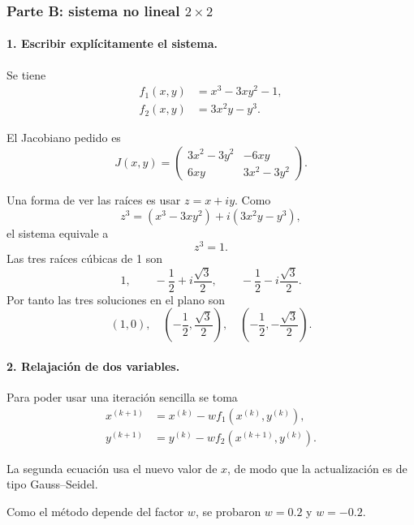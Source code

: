 \documentclass[11pt,a4paper]{article}
\begin{document}
\subsubsection*{Parte B: sistema no lineal $2\times2$}

\paragraph{1. Escribir explícitamente el sistema.}

Se tiene
\begin{align}
f_1(x,y)&=x^3-3xy^2-1,\\
f_2(x,y)&=3x^2y-y^3.
\end{align}

El Jacobiano pedido es
\begin{equation}
\boxed{
J(x,y)=
\begin{pmatrix}
3x^2-3y^2&-6xy\\
6xy&3x^2-3y^2
\end{pmatrix}.}
\end{equation}

Una forma de ver las raíces es usar $z=x+iy$. Como
\[
z^3=(x^3-3xy^2)+i(3x^2y-y^3),
\]
el sistema equivale a
\[
z^3=1.
\]
Las tres raíces cúbicas de 1 son
\[
1,
\qquad
-\frac12+i\frac{\sqrt3}{2},
\qquad
-\frac12-i\frac{\sqrt3}{2}.
\]
Por tanto las tres soluciones en el plano son
\begin{equation}
\boxed{(1,0),
\quad
\left(-\frac12,\frac{\sqrt3}{2}\right),
\quad
\left(-\frac12,-\frac{\sqrt3}{2}\right).}
\end{equation}

\paragraph{2. Relajación de dos variables.}

Para poder usar una iteración sencilla se toma
\begin{align}
x^{(k+1)}&=x^{(k)}-w f_1(x^{(k)},y^{(k)}),\\
y^{(k+1)}&=y^{(k)}-w f_2(x^{(k+1)},y^{(k)}).
\end{align}

La segunda ecuación usa el nuevo valor de $x$, de modo que la actualización es de tipo Gauss--Seidel.

Como el método depende del factor $w$, se probaron $w=0.2$ y $w=-0.2$.
\end{document}
